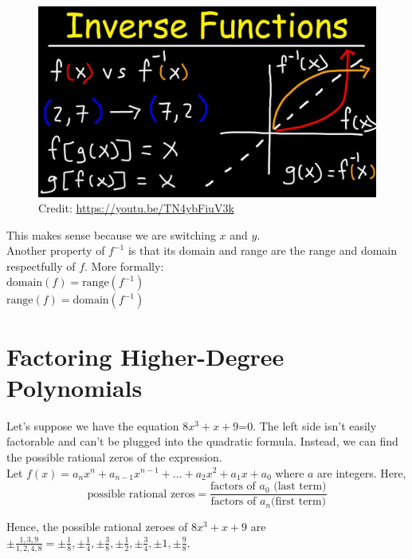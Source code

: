 \documentclass[12pt]{article}
\begin{document}
\begin{figure}[H]
	\centering
	\includegraphics[scale=0.2]{maxresdefault.jpg}
	\caption{Credit: \url{https://youtu.be/TN4ybFiuV3k}}
\end{figure}

This makes sense because we are switching \(x\) and \(y\).\\

Another property of \(f^{-1}\) is that its domain and range are the range and domain respectfully of \(f\). More formally:\\

\(\text{domain}(f)=\text{range}(f^{-1})\)\\

\(\text{range}(f)=\text{domain}(f^{-1})\)\\

\section{Factoring Higher-Degree Polynomials}

Let's suppose we have the equation \(8x^3+x+9\)=0. The left side isn't easily factorable and can't be plugged into the quadratic formula. Instead, we can find the possible rational zeros of the expression.\\

Let \(f(x)=a_nx^n+a_{n-1}x^{n-1}+...+a_2x^2+a_1x+a_0\) where  \(a\) are integers. Here,\\

\[\text{possible rational zeros}=\frac{\text{factors of }a_0\text{ (last term)}}{\text{factors of }a_n\text{(first term)}}\]

Hence, the possible rational zeroes of \(8x^3+x+9\) are \(\pm\frac{1,3,9}{1,2,4,8}=\pm\frac{1}{8},\pm\frac{1}{4}, \pm\frac{3}{8},\pm\frac{1}{2}, \pm\frac{3}{4},\pm1, \pm\frac{9}{8},\)
\end{document}
